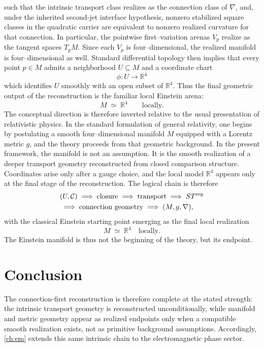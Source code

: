 such that the intrinsic transport class realizes as the connection
class of \(\nabla\), and, under the inherited second-jet interface
hypothesis, nonzero stabilized square classes in the quadratic carrier
are equivalent to nonzero realized curvature for that connection.
In particular, the pointwise first--variation arenas \(V_p\) realize as
the tangent spaces \(T_pM\).  Since each \(V_p\) is four--dimensional,
the realized manifold is four--dimensional as well.
\medskip
Standard differential topology then implies that every point
\(p\in M\) admits a neighborhood \(U\subseteq M\) and a coordinate
chart
\[
	\phi:U\to\mathbb{R}^4
\]
which identifies \(U\) smoothly with an open subset of \(\mathbb{R}^4\).
Thus the final geometric output of the reconstruction is the familiar
local Einstein arena:
\[
	M \;\simeq\; \mathbb{R}^4
	\qquad \text{locally}.
\]
\medskip
The conceptual direction is therefore inverted relative to the usual
presentation of relativistic physics.
In the standard formulation of general relativity, one begins by
postulating a smooth four--dimensional manifold \(M\) equipped with a
Lorentz metric \(g\), and the theory proceeds from that geometric
background.
In the present framework, the manifold is not an assumption.  It is the
smooth realization of a deeper transport geometry reconstructed from
closed comparison structure.  Coordinates arise only after a gauge
choice, and the local model \(\mathbb{R}^4\) appears only at the final
stage of the reconstruction.
\medskip
The logical chain is therefore
\[
	\begin{aligned}
		 & (U,\mathcal C)
		\;\Longrightarrow\;
		\text{closure}
		\;\Longrightarrow\;
		\text{transport}
		\;\Longrightarrow\;
		ST^{\mathrm{reg}}
		\\
		 & \;\Longrightarrow\;
		\text{connection geometry}
		\;\Longrightarrow\;
		(M,g,\nabla),
	\end{aligned}
\]
with the classical Einstein starting point emerging as the final local
realization
\[
	M \;\simeq\; \mathbb{R}^4
	\quad \text{locally}.
\]
The Einstein manifold is thus not the beginning of the theory, but its
endpoint.

\section{Conclusion}
\label{sec:connection-transition}
The connection-first reconstruction is therefore complete at the stated
strength: the intrinsic transport geometry is reconstructed
unconditionally, while manifold and metric geometry appear as realized
endpoints only when a compatible smooth realization exists, not as
primitive background assumptions.
Accordingly, \cref{ch:em} extends this same intrinsic chain to the electromagnetic
phase sector.

\begin{chapterclosing}
\end{chapterclosing}

